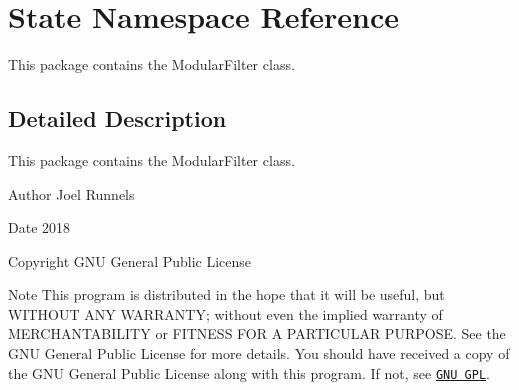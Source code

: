 \hypertarget{namespaceState}{}\section{State Namespace Reference}
\label{namespaceState}


This package contains the Modular\+Filter class.  




\subsection{Detailed Description}
This package contains the Modular\+Filter class. 

\begin{DoxyAuthor}{Author}
Joel Runnels 
\end{DoxyAuthor}
\begin{DoxyDate}{Date}
2018 
\end{DoxyDate}
\begin{DoxyCopyright}{Copyright}
G\+NU General Public License
\end{DoxyCopyright}
\begin{DoxyNote}{Note}
This program is distributed in the hope that it will be useful, but W\+I\+T\+H\+O\+UT A\+NY W\+A\+R\+R\+A\+N\+TY; without even the implied warranty of M\+E\+R\+C\+H\+A\+N\+T\+A\+B\+I\+L\+I\+TY or F\+I\+T\+N\+E\+SS F\+OR A P\+A\+R\+T\+I\+C\+U\+L\+AR P\+U\+R\+P\+O\+SE. See the G\+NU General Public License for more details. You should have received a copy of the G\+NU General Public License along with this program. If not, see \href{http://www.gnu.org/licenses/}{\tt G\+NU G\+PL}. 
\end{DoxyNote}
